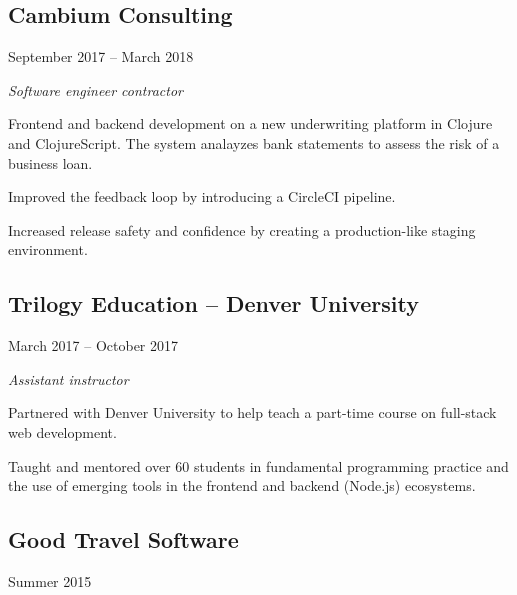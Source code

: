 \begin{minipage}[t]{0.55\textwidth}
  \subsection*{Cambium Consulting}
\end{minipage}
\noindent\begin{minipage}[t]{0.45\textwidth}
  \flushright
  September 2017 -- March 2018
\end{minipage}

\emph{Software engineer contractor}

\begin{itemize}
  {\small
  \item Frontend and backend development on a new underwriting platform in
    Clojure and ClojureScript. The system analayzes bank statements to assess
    the risk of a business loan.
  \item Improved the feedback loop by introducing a CircleCI pipeline.
  \item Increased release safety and confidence by creating a production-like
    staging environment.
  }
\end{itemize}

\noindent\begin{minipage}[t]{0.55\textwidth}
\subsection*{Trilogy Education -- Denver University}
\end{minipage}
\noindent\begin{minipage}[t]{0.45\textwidth}
  \flushright
  March 2017 -- October 2017
\end{minipage}

\emph{Assistant instructor}

\begin{itemize}
  {\small
  \item Partnered with Denver University to help teach a part-time course on
    full-stack web development.
  \item Taught and mentored over 60 students in fundamental programming practice
    and the use of emerging tools in the frontend and backend (Node.js)
    ecosystems.
  }
\end{itemize}

\noindent\begin{minipage}[t]{0.5\textwidth}
  \subsection*{Good Travel Software}
\end{minipage}
\noindent\begin{minipage}[t]{0.5\textwidth}
  \flushright
  Summer 2015
\end{minipage}

